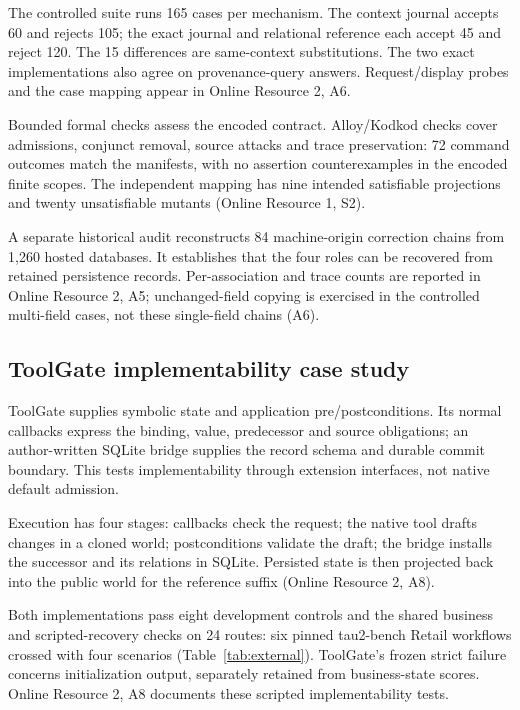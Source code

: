 \documentclass[pdflatex,sn-basic]{sn-jnl}
\begin{document}
The controlled suite runs 165 cases per mechanism. The context journal accepts 60 and rejects 105; the exact journal and relational reference each accept 45 and reject 120. The 15 differences are same-context substitutions. The two exact implementations also agree on provenance-query answers. Request/display probes and the case mapping appear in Online Resource 2, A6.

Bounded formal checks assess the encoded contract. Alloy/Kodkod checks \citep{alloy,kodkod} cover admissions, conjunct removal, source attacks and trace preservation: 72 command outcomes match the manifests, with no assertion counterexamples in the encoded finite scopes. The independent mapping has nine intended satisfiable projections and twenty unsatisfiable mutants (Online Resource 1, S2).

A separate historical audit reconstructs 84 machine-origin correction chains from 1,260 hosted databases. It establishes that the four roles can be recovered from retained persistence records. Per-association and trace counts are reported in Online Resource 2, A5; unchanged-field copying is exercised in the controlled multi-field cases, not these single-field chains (A6).

\subsection{ToolGate implementability case study}\label{configured-toolgate-on-public-reference-workflows}

ToolGate \citep{toolgate} supplies symbolic state and application pre/postconditions. Its normal callbacks express the binding, value, predecessor and source obligations; an author-written SQLite bridge supplies the record schema and durable commit boundary. This tests implementability through extension interfaces, not native default admission.

Execution has four stages: callbacks check the request; the native tool drafts changes in a cloned world; postconditions validate the draft; the bridge installs the successor and its relations in SQLite. Persisted state is then projected back into the public world for the reference suffix (Online Resource 2, A8).

Both implementations pass eight development controls and the shared business and scripted-recovery checks on 24 routes: six pinned tau2-bench Retail workflows \citep{tau2-bench} crossed with four scenarios (Table~\ref{tab:external}). ToolGate's frozen strict failure concerns initialization output, separately retained from business-state scores. Online Resource 2, A8 documents these scripted implementability tests.
\end{document}
